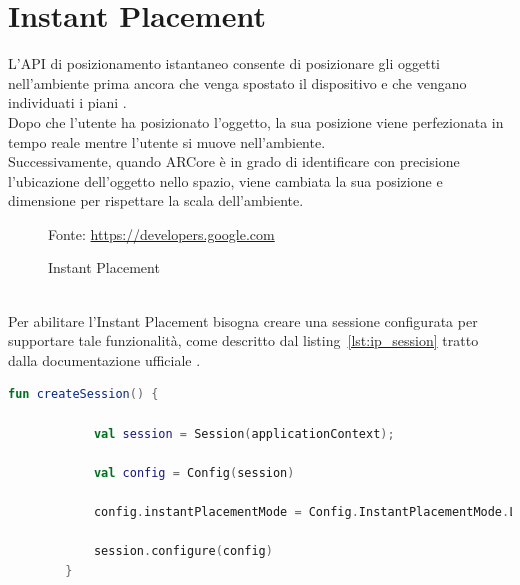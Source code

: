 \documentclass[crop=false, class=book]{standalone}
\begin{document}
	\chapter{Instant Placement}
	L'API di posizionamento istantaneo consente di posizionare gli oggetti nell’ambiente prima ancora che venga spostato il dispositivo e che vengano individuati i piani \cite{google2022instant}. \\
	\noindent
	Dopo che l’utente ha posizionato l’oggetto, la sua posizione viene perfezionata in tempo reale mentre l’utente si muove nell’ambiente.
	\\
	\noindent
	Successivamente, quando ARCore è in grado di identificare con precisione l’ubicazione dell’oggetto nello spazio, viene cambiata la sua posizione e dimensione per rispettare la scala dell’ambiente.
	\begin{figure}
		\centering
		{Fonte: \url{https://developers.google.com}}
		\caption{Instant Placement}
		\label{fig:instant}
	\end{figure}
	\\
	\noindent
	Per abilitare l’Instant Placement bisogna creare una sessione configurata per supportare tale funzionalità, come descritto dal listing~\vref{lst:ip_session} tratto dalla documentazione ufficiale \cite{google2022instant2}.
		
	\begin{center}
		\begin{minipage}{0.95\textwidth}
			\begin{lstlisting}[caption={Creazione della sessione ARCore con Instant Placement abilitato.}, label={lst:ip_session}, language=Kotlin]
			fun createSession() {
				
			val session = Session(applicationContext);
			
			val config = Config(session)
			
			config.instantPlacementMode = Config.InstantPlacementMode.LOCAL_Y_UP
			
			session.configure(config)
		}
		\end{lstlisting}
		\end{minipage}
	\end{center}
\end{document}
